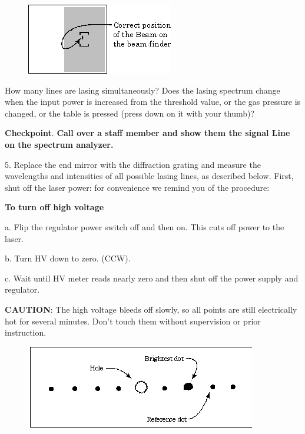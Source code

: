 \documentclass{../lab}
\begin{document}
\begin{figure}[h]
    \centering
    \href{http://experimentationlab.berkeley.edu/sites/default/files/images/CO26.gif}{\includegraphics[width=\linewidth]{images/CO26.png}}
    \caption{}
    \label{fig:CO26}
\end{figure}


How many lines are lasing simultaneously? Does the lasing spectrum change when the input power is increased from the threshold value, or the gas pressure is changed, or the table is pressed (press down on it with your thumb)?


\textbf{Checkpoint}. \textbf{Call over a staff member and show them the signal Line on the spectrum analyzer.}


5. Replace the end mirror with the diffraction grating and measure the wavelengths and intensities of all possible lasing lines, as described below. First, shut off the laser power: for convenience we remind you of the procedure:

\textbf{To turn off high voltage}

a. Flip the regulator power switch off and then on. This cuts off power to the laser.

b. Turn HV down to zero. (CCW).

c. Wait until HV meter reads nearly zero and then shut off the power supply and regulator.

\textbf{CAUTION}: The high voltage bleeds off slowly, so all points are still electrically hot for several minutes. Don't touch them without supervision or prior instruction.


\begin{figure}[h]
    \centering
    \href{http://experimentationlab.berkeley.edu/sites/default/files/images/CO27.gif}{\includegraphics[width=\linewidth]{images/CO27.png}}
    \caption{}
    \label{fig:CO27}
\end{figure}
\end{document}
